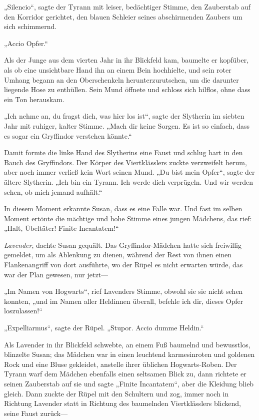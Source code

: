 {„Silencio“, sagte der Tyrann mit leiser, bedächtiger Stimme, den Zauberstab auf den Korridor gerichtet, den blauen Schleier seines abschirmenden Zaubers um sich schimmernd.

„Accio Opfer.“

Als der Junge aus dem vierten Jahr in ihr Blickfeld kam, baumelte er kopfüber, als ob eine unsichtbare Hand ihn an einem Bein hochhielte, und sein roter Umhang begann an den Oberschenkeln herunterzurutschen, um die darunter liegende Hose zu enthüllen. Sein Mund öffnete und schloss sich hilflos, ohne dass ein Ton herauskam.

„Ich nehme an, du fragst dich, was hier los ist“, sagte der Slytherin im siebten Jahr mit ruhiger, kalter Stimme. „Mach dir keine Sorgen. Es ist so einfach, dass es sogar ein Gryffindor verstehen könnte.“

Damit formte die linke Hand des Slytherins eine Faust und schlug hart in den Bauch des Gryffindors. Der Körper des Viertklässlers zuckte verzweifelt herum, aber noch immer verließ kein Wort seinen Mund. „Du bist mein Opfer“, sagte der ältere Slytherin. „Ich bin ein Tyrann. Ich werde dich verprügeln. Und wir werden sehen, ob mich jemand aufhält.“

In diesem Moment erkannte Susan, dass es eine Falle war. Und fast im selben Moment ertönte die mächtige und hohe Stimme eines jungen Mädchens, das rief: „Halt, Übeltäter! Finite Incantatem!“

\emph{Lavender}, dachte Susan gequält. Das Gryffindor-Mädchen hatte sich freiwillig gemeldet, um als Ablenkung zu dienen, während der Rest von ihnen einen Flankenangriff von dort ausführte, wo der Rüpel es nicht erwarten würde, das war der Plan gewesen, nur jetzt—

„Im Namen von Hogwarts“, rief Lavenders Stimme, obwohl sie sie nicht sehen konnten, „und im Namen aller Heldinnen überall, befehle ich dir, dieses Opfer loszulassen!“

„Expelliarmus“, sagte der Rüpel. „Stupor. Accio dumme Heldin.“

Als Lavender in ihr Blickfeld schwebte, an einem Fuß baumelnd und bewusstlos, blinzelte Susan; das Mädchen war in einen leuchtend karmesinroten und goldenen Rock und eine Bluse gekleidet, anstelle ihrer üblichen Hogwarts-Roben. Der Tyrann warf dem Mädchen ebenfalls einen seltsamen Blick zu, dann richtete er seinen Zauberstab auf sie und sagte „Finite Incantatem“, aber die Kleidung blieb gleich. Dann zuckte der Rüpel mit den Schultern und zog, immer noch in Richtung Lavender statt in Richtung des baumelnden Viertklässlers blickend, seine Faust zurück—

}
